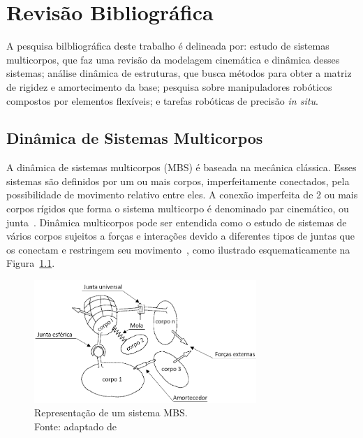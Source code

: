 \chapter{Revisão Bibliográfica}

A pesquisa bilbliográfica deste trabalho é delineada por: estudo de sistemas
multicorpos, que faz uma revisão da modelagem cinemática e dinâmica desses
sistemas; análise dinâmica de estruturas, que busca métodos para obter a matriz
de rigidez e amortecimento da base; pesquisa sobre manipuladores robóticos
compostos por elementos flexíveis; e tarefas robóticas de precisão \textit{in
situ}.


\section{Dinâmica de Sistemas Multicorpos}

A dinâmica de sistemas multicorpos (MBS) é baseada na mecânica clássica. Esses
sistemas são definidos por um ou mais corpos, imperfeitamente conectados, pela
possibilidade de movimento relativo entre eles. A conexão imperfeita de 2 ou
mais corpos rígidos que forma o sistema multicorpo é denominado par cinemático,
ou junta~\cite{de2012kinematic}. Dinâmica multicorpos pode ser entendida como o
estudo de sistemas de vários corpos sujeitos a forças e interações devido a
diferentes tipos de juntas que os conectam e restringem seu
movimento~\cite{flores2008kinematics}, como ilustrado esquematicamente na
Figura~\ref{fig::mbs_diagram}.

\begin{figure}[h]
	\centering 
 	\includegraphics[width=0.75\textwidth]{figs/mbs_diagram}
 	\caption[Representação de um sistema MBS]{Representação de um sistema MBS.
 	\\Fonte: adaptado de \cite{neto2003stabilization}}
 	\label{fig::mbs_diagram}
\end{figure}

